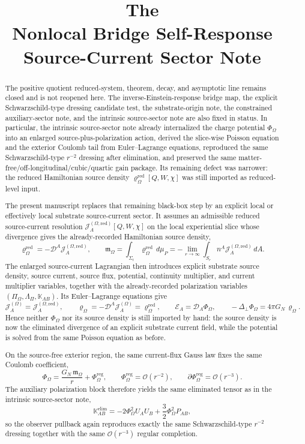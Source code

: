 \documentclass[11pt]{article}
\title{\textbf{The \TheoryName{}}\\[0.4em]
\large Nonlocal Bridge Self-Response Source-Current Sector Note}
\author{}
\date{}
\newcommand{\ProjSub}{P}
\newcommand{\SpatialD}{\mathcal D}
\newcommand{\LapPerp}{\Delta_\perp}
\newcommand{\FlowPot}{\Phi_\Omega}
\newcommand{\FlowPotReg}{\Phi_\Omega^{\mathrm{reg}}}
\newcommand{\BalanceField}{\Pi_\Omega}
\newcommand{\BalMult}{\Lambda_\Pi}
\newcommand{\SourceDensity}{\varrho_\Omega}
\newcommand{\SourceDensityRed}{\varrho_\Omega^{\mathrm{red}}}
\newcommand{\SourceCurrent}{\mathcal J^{(\Omega)}}
\newcommand{\SourceCurrentRed}{\mathcal J^{(\Omega,\mathrm{red})}}
\newcommand{\SourceFlux}{\mathcal E}
\newcommand{\HamChargeOmega}{\mathfrak m_\Omega}
\newcommand{\AuxPol}{\mathbb K}
\begin{document}
\maketitle

\begin{abstract}
The positive quotient reduced-system, theorem, decay, and asymptotic line remains closed and is not reopened here. The inverse-Einstein-response bridge map, the explicit Schwarzschild-type dressing candidate test, the substrate-origin note, the constrained auxiliary-sector note, and the intrinsic source-sector note are also fixed in status. In particular, the intrinsic source-sector note already internalized the charge potential \(\FlowPot\) into an enlarged source-plus-polarization action, derived the slice-wise Poisson equation and the exterior Coulomb tail from Euler--Lagrange equations, reproduced the same Schwarzschild-type \(r^{-2}\) dressing after elimination, and preserved the same matter-free/off-longitudinal/cubic/quartic gain package. Its remaining defect was narrower: the reduced Hamiltonian source density \(\SourceDensityRed[Q,W,\chi]\) was still imported as reduced-level input.

The present manuscript replaces that remaining black-box step by an explicit local or effectively local substrate source-current sector. It assumes an admissible reduced source-current resolution \(\SourceCurrentRed_A[Q,W,\chi]\) on the local experiential slice whose divergence gives the already-recorded Hamiltonian source density,
\[
\SourceDensityRed
=
-\SpatialD^A \SourceCurrentRed_A,
\qquad
\HamChargeOmega
=
\int_{\Sigma_t}\SourceDensityRed\,d\mu_P
=
-\lim_{r\to\infty}\int_{S_r} n^A\SourceCurrentRed_A\,dA.
\]
The enlarged source-current Lagrangian then introduces explicit substrate source density, source current, source flux, potential, continuity multiplier, and current multiplier variables, together with the already-recorded polarization variables \((\BalanceField,\BalMult,\AuxPol_{AB})\). Its Euler--Lagrange equations give
\[
\SourceCurrent_A=\SourceCurrentRed_A,
\qquad
\SourceDensity=-\SpatialD^A\SourceCurrent_A=\SourceDensityRed,
\qquad
\SourceFlux_A=\SpatialD_A\FlowPot,
\qquad
-\LapPerp\FlowPot=4\pi G_N\,\SourceDensity.
\]
Hence neither \(\FlowPot\) nor its source density is still imported by hand: the source density is now the eliminated divergence of an explicit substrate current field, while the potential is solved from the same Poisson equation as before.

On the source-free exterior region, the same current-flux Gauss law fixes the same Coulomb coefficient,
\[
\FlowPot
=
\frac{G_N\,\HamChargeOmega}{r}
+\FlowPotReg,
\qquad
\FlowPotReg=\mathcal O(r^{-2}),
\qquad
\partial\FlowPotReg=\mathcal O(r^{-3}).
\]
The auxiliary polarization block therefore yields the same eliminated tensor as in the intrinsic source-sector note,
\[
\AuxPol_{AB}^{\mathrm{elim}}
=
-2\FlowPot^2U_AU_B
+\frac32\FlowPot^2\ProjSub_{AB},
\]
so the observer pullback again reproduces exactly the same Schwarzschild-type \(r^{-2}\) dressing together with the same \(\mathcal O(r^{-3})\) regular completion.


\end{abstract}
\end{document}

